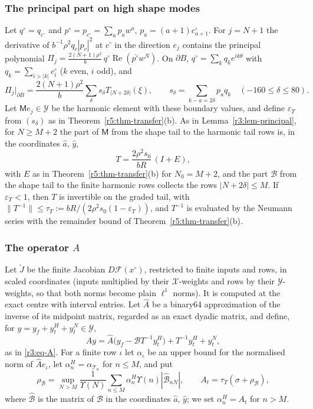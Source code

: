 \documentclass[11pt]{amsart}
\theoremstyle{definition}
\theoremstyle{remark}
\numberwithin{equation}{section}
\newcommand{\Fc}{\mathcal{F}}
\newcommand{\eps}{\varepsilon}
\DeclareMathOperator{\re}{Re}
\newcommand{\nrm}[1]{\lVert #1\rVert}
\begin{document}
\subsubsection*{The principal part on high shape modes}
Let $q^\circ=q_{c^\circ}$ and $p^\circ=p_{c^\circ}=\sum_ap_aw^a$, $p_a=(a+1)c^\circ_{a+1}$. For $j=N+1$ the derivative of $b^{-1}\rho^2q_c|p_c|^2$ at $c^\circ$ in the direction $e_j$ contains the principal polynomial $\Pi_j=\frac{2(N+1)\rho^2}b\,q^\circ\re(\overline{p^\circ}w^N)$. On $\partial B$, $q^\circ=\sum_kq_ke^{ik\theta}$ with $q_k=\sum_{i>|k|}c^\circ_i$ ($k$ even, $i$ odd), and
\[
\Pi_j|_{\partial B}=\frac{2(N+1)\rho^2}b\sum_\delta s_\delta T_{|N+2\delta|}(\xi),\qquad s_\delta=\sum_{k-a=2\delta}p_aq_k\quad(-160\leq\delta\leq80).
\]
Let $\mathsf Me_j\in\mathcal Y$ be the harmonic element with these boundary values, and define $\eps_\Upsilon$ from $(s_\delta)$ as in Theorem~\ref{r5:thm-transfer}(b). As in Lemma~\ref{r3:lem-principal}, for $N\geq M+2$ the part of $\mathsf M$ from the shape tail to the harmonic tail rows is, in the coordinates $\hat a$, $\hat y$,
\[
T=\frac{2\rho^2s_0}{bR}\,(I+E),
\]
with $E$ as in Theorem~\ref{r5:thm-transfer}(b) for $N_0=M+2$, and the part $\mathcal B$ from the shape tail to the finite harmonic rows collects the rows $|N+2\delta|\leq M$. If $\eps_\Upsilon<1$, then $T$ is invertible on the graded tail, with $\nrm{T^{-1}}\leq\tau_T:=bR/(2\rho^2s_0(1-\eps_\Upsilon))$, and $T^{-1}$ is evaluated by the Neumann series with the remainder bound of Theorem~\ref{r5:thm-transfer}(b).

\subsubsection*{The operator $A$}
Let $\widetilde J$ be the finite Jacobian $D\Fc(x^\circ)$, restricted to finite inputs and rows, in scaled coordinates (inputs multiplied by their $\mathcal X$-weights and rows by their $\mathcal Y$-weights, so that both norms become plain $\ell^1$ norms). It is computed at the exact centre with interval entries. Let $\widehat A$ be a binary64 approximation of the inverse of its midpoint matrix, regarded as an exact dyadic matrix, and define, for $y=y_f+y^H_t+y^N_t\in\mathcal Y$,
\begin{equation}\label{r5:eq-A}
Ay=\widehat A\big(y_f-\mathcal BT^{-1}y^H_t\big)+T^{-1}y^H_t+y^N_t,
\end{equation}
as in \eqref{r3:eq-A}. For a finite row $\iota$ let $\alpha_\iota$ be an upper bound for the normalised norm of $\widehat Ae_\iota$, let $\alpha^H_n=\alpha_{\mathcal T_n}$ for $n\leq M$, and put
\[
\rho_{\mathcal B}=\sup_{N>M}\frac1{\Upsilon(N)}\sum_{n\leq M}\alpha^H_n\Upsilon(n)|\hat{\mathcal B}_{nN}|,\qquad A_t=\tau_T(\sigma+\rho_{\mathcal B}),
\]
where $\hat{\mathcal B}$ is the matrix of $\mathcal B$ in the coordinates $\hat a$, $\hat y$; we set $\alpha^H_n=A_t$ for $n>M$.
\end{document}
